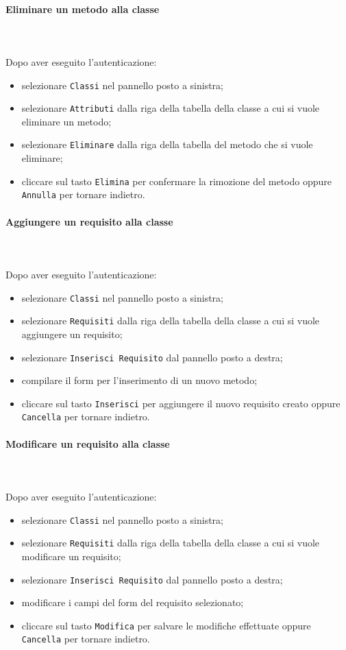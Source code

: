 \paragraph{Eliminare un metodo alla classe} \mbox{}\\ \mbox{}\\
Dopo aver eseguito l'autenticazione:
\begin{itemize}
	\item selezionare \texttt{Classi} nel pannello posto a sinistra;
	\item selezionare \texttt{Attributi} dalla riga della tabella della classe
		a cui si vuole eliminare un metodo;\
	\item selezionare \texttt{Eliminare} dalla riga della tabella del metodo
		che si vuole eliminare;
	\item cliccare sul tasto \texttt{Elimina} per confermare la rimozione del metodo
		oppure \texttt{Annulla} per tornare indietro.
\end{itemize}

\paragraph{Aggiungere un requisito alla classe} \mbox{}\\ \mbox{}\\
Dopo aver eseguito l'autenticazione:
\begin{itemize}
	\item selezionare \texttt{Classi} nel pannello posto a sinistra;
	\item selezionare \texttt{Requisiti} dalla riga della tabella della classe
		a cui si vuole aggiungere un requisito;
	\item selezionare \texttt{Inserisci Requisito} dal pannello posto a destra;
	\item compilare il form per l'inserimento di un nuovo metodo;
	\item cliccare sul tasto \texttt{Inserisci} per aggiungere il nuovo requisito 
		creato oppure \texttt{Cancella} per tornare indietro.	
\end{itemize}

\paragraph{Modificare un requisito alla classe} \mbox{}\\ \mbox{}\\
Dopo aver eseguito l'autenticazione:
\begin{itemize}
	\item selezionare \texttt{Classi} nel pannello posto a sinistra;
	\item selezionare \texttt{Requisiti} dalla riga della tabella della classe
		a cui si vuole modificare un requisito;
	\item selezionare \texttt{Inserisci Requisito} dal pannello posto a destra;
	\item modificare i campi del form del requisito selezionato;
	\item cliccare sul tasto \texttt{Modifica} per salvare le modifiche effettuate
		oppure \texttt{Cancella} per tornare indietro.
\end{itemize}

